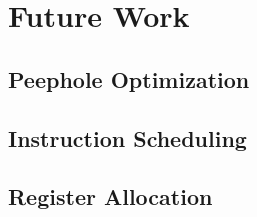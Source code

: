 %

\chapter{Future Work}

\section{Peephole Optimization}
\section{Instruction Scheduling}
\section{Register Allocation}
